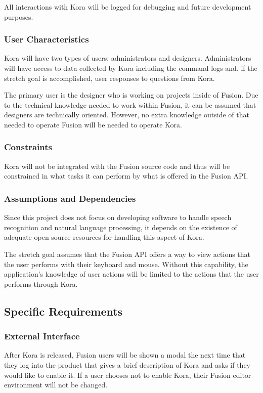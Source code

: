 \documentclass[onecolumn, draftclsnofoot,10pt, compsoc]{IEEEtran}
\def \botname{Kora\xspace}
\begin{document}
	All interactions with \botname will be logged for debugging and future development purposes.

	\subsubsection{User Characteristics}
	\botname will have two types of users: administrators and designers.
	Administrators will have access to data collected by \botname including the command logs and, if the stretch goal is accomplished, user responses to questions from \botname.

	The primary user is the designer who is working on projects inside of Fusion.
	Due to the technical knowledge needed to work within Fusion, it can be assumed that designers are technically oriented.
	However, no extra knowledge outside of that needed to operate Fusion will be needed to operate \botname.

	\subsubsection{Constraints}
	\botname will not be integrated with the Fusion source code and thus will be constrained in what tasks it can perform by what is offered in the Fusion API.

	\subsubsection{Assumptions and Dependencies}
	Since this project does not focus on developing software to handle speech recognition and natural language processing, it depends on the existence of adequate open source resources for handling this aspect of \botname.

	The stretch goal assumes that the Fusion API offers a way to view actions that the user performs with their keyboard and mouse.
	Without this capability, the application's knowledge of user actions will be limited to the actions that the user performs through \botname.

	\subsection{Specific Requirements}
	\subsubsection{External Interface}
	 After \botname is released, Fusion users will be shown a modal the next time that they log into the product that gives a brief description of \botname and asks if they would like to enable it.
	If a user chooses not to enable \botname, their Fusion editor environment will not be changed.
\end{document}
